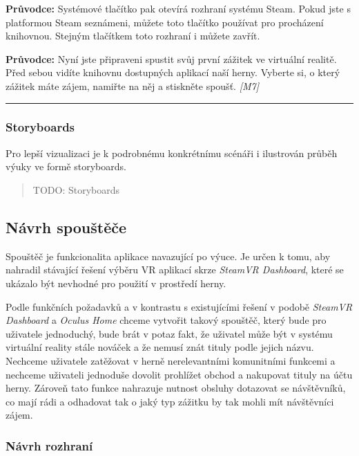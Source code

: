 \textbf{Průvodce:} Systémové tlačítko pak otevírá rozhraní systému
Steam. Pokud jste s platformou Steam seznámeni, můžete toto tlačítko
používat pro procházení knihovnou. Stejným tlačítkem toto rozhraní i
můžete zavřít.

\textbf{Průvodce:} Nyní jste připraveni spustit svůj první zážitek ve
virtuální realitě. Před sebou vidíte knihovnu dostupných aplikací naší
herny. Vyberte si, o který zážitek máte zájem, namiřte na něj a
stiskněte spoušť. \emph{{[}M7{]}}

\begin{center}\rule{0.5\linewidth}{\linethickness}\end{center}

\subsubsection{Storyboards}\label{storyboards}

Pro lepší vizualizaci je k podrobnému konkrétnímu scénáři i ilustrován
průběh výuky ve formě storyboards.

\begin{quote}
TODO: Storyboards
\end{quote}

\subsection{Návrh spouštěče}\label{nuxe1vrh-spouux161tux11bux10de}

Spouštěč je funkcionalita aplikace navazující po výuce. Je určen k tomu,
aby nahradil stávající řešení výběru VR aplikací skrze \emph{SteamVR
Dashboard}, které se ukázalo být nevhodné pro použití v prostředí herny.

Podle funkčních požadavků a v kontrastu s existujícími řešení v podobě
\emph{SteamVR Dashboard} a \emph{Oculus Home} chceme vytvořit takový
spouštěč, který bude pro uživatele jednoduchý, bude brát v potaz fakt,
že uživatel může být v systému virtuální reality stále nováček a že
nemusí znát tituly podle jejich názvu. Nechceme uživatele zatěžovat v
herně nerelevantními komunitními funkcemi a nechceme uživateli jednoduše
dovolit prohlížet obchod a nakupovat tituly na účtu herny. Zároveň tato
funkce nahrazuje nutnost obsluhy dotazovat se návštěvníků, co mají rádi
a odhadovat tak o jaký typ zážitku by tak mohli mít návštěvníci zájem.

\subsubsection{Návrh rozhraní}\label{nuxe1vrh-rozhranuxed}

